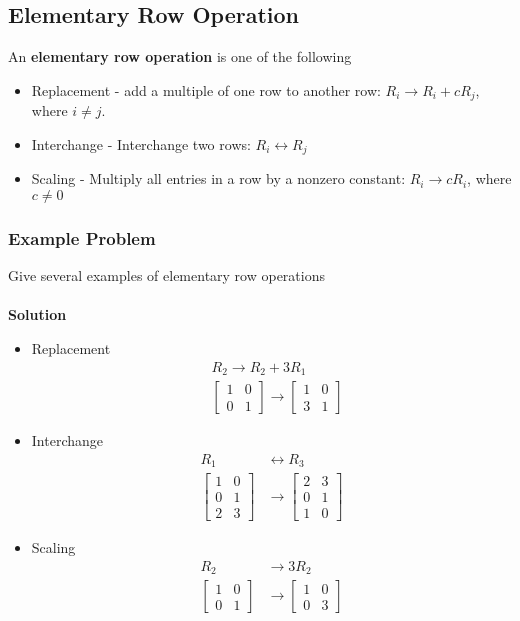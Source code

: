 \subsection{Elementary Row Operation}
An \textbf{elementary row operation} is one of the following
\begin{itemize}
  \item Replacement - add a multiple of one row to another row: $R_i \rightarrow R_i + cR_j$, where $i \neq j$.
  \item Interchange - Interchange two rows: $R_i \leftrightarrow R_j$
  \item Scaling - Multiply all entries in a row by a nonzero constant: $R_i \rightarrow cR_i$, where $c \neq 0$
\end{itemize}
\subsubsection{Example Problem}
Give several examples of elementary row operations \\\\
\textbf{Solution}
\begin{itemize}
  \item Replacement
  \[  
    \begin{align}
      &R_2 \rightarrow R_2 + 3R_1 \\
      &\begin{bmatrix}
        1 & 0 \\
        0 & 1
      \end{bmatrix} \rightarrow
      \begin{bmatrix}
        1 & 0 \\
        3 & 1
      \end{bmatrix}
    \end{align}
  \]
  \item Interchange
  \[
    \begin{align}
      R_1 &\leftrightarrow R_3 \\  
      \begin{bmatrix}
        1 & 0 \\
        0 & 1 \\
        2 & 3
      \end{bmatrix} &\rightarrow
      \begin{bmatrix}
        2 & 3 \\
        0 & 1 \\
        1 & 0
      \end{bmatrix}
    \end{align}
  \]
  \item Scaling
  \[
    \begin{align}
      R_2 &\rightarrow 3R_2 \\    
      \begin{bmatrix}
        1 & 0 \\
        0 & 1
      \end{bmatrix} &\rightarrow 
      \begin{bmatrix}
        1 & 0 \\
        0 & 3
      \end{bmatrix}
    \end{align}
  \]
\end{itemize}
